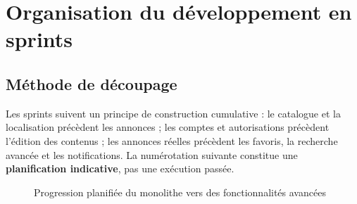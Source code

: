 \chapter{Organisation du développement en sprints}
\section{Méthode de découpage}
Les sprints suivent un principe de construction cumulative : le catalogue et la localisation précèdent les annonces ; les comptes et autorisations précèdent l’édition des contenus ; les annonces réelles précèdent les favoris, la recherche avancée et les notifications. La numérotation suivante constitue une \textbf{planification indicative}, pas une exécution passée.

\begin{figure}[htbp]\centering

\caption{Progression planifiée du monolithe vers des fonctionnalités avancées}
\label{fig:phases}
\end{figure}

